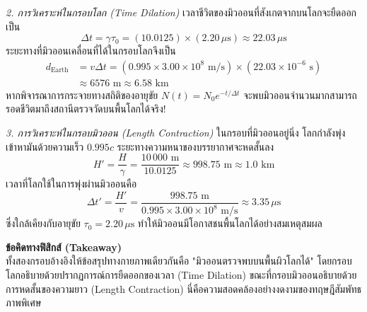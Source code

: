 \begin{psctexample}
\textit{2. การวิเคราะห์ในกรอบโลก (Time Dilation)}
เวลาชีวิตของมิวออนที่สังเกตจากบนโลกจะยืดออกเป็น
\begin{equation}
\Delta t = \gamma \tau_0 = (10.0125) \times (2.20\,\mu\text{s}) \approx 22.03\,\mu\text{s}
\end{equation}
ระยะทางที่มิวออนเคลื่อนที่ได้ในกรอบโลกจึงเป็น
\begin{align}
d_{\text{Earth}} &= v \Delta t = (0.995 \times 3.00 \times 10^8\text{ m/s}) \times (22.03 \times 10^{-6}\text{ s}) \nonumber \\
&\approx 6576\text{ m} \approx 6.58\text{ km}
\end{align}
หากพิจารณาการกระจายทางสถิติของอายุขัย $N(t) = N_0 e^{-t/\Delta t}$ จะพบมิวออนจำนวนมากสามารถรอดชีวิตมาถึงสถานีตรวจวัดบนพื้นโลกได้จริง!

\textit{3. การวิเคราะห์ในกรอบมิวออน (Length Contraction)}
ในกรอบที่มิวออนอยู่นิ่ง โลกกำลังพุ่งเข้าหามันด้วยความเร็ว $0.995c$ ระยะทางความหนาของบรรยากาศจะหดสั้นลง
\begin{equation}
H' = \frac{H}{\gamma} = \frac{10\,000\text{ m}}{10.0125} \approx 998.75\text{ m} \approx 1.0\text{ km}
\end{equation}
เวลาที่โลกใช้ในการพุ่งผ่านมิวออนคือ
\begin{equation}
\Delta t' = \frac{H'}{v} = \frac{998.75\text{ m}}{0.995 \times 3.00 \times 10^8\text{ m/s}} \approx 3.35\,\mu\text{s}
\end{equation}
ซึ่งใกล้เคียงกับอายุขัย $\tau_0 = 2.20\,\mu\text{s}$ ทำให้มิวออนมีโอกาสชนพื้นโลกได้อย่างสมเหตุสมผล

\textbf{ข้อคิดทางฟิสิกส์ (Takeaway)} \\
ทั้งสองกรอบอ้างอิงให้ข้อสรุปทางกายภาพเดียวกันคือ "มิวออนตรวจพบบนพื้นผิวโลกได้" โดยกรอบโลกอธิบายด้วยปรากฏการณ์การยืดออกของเวลา (Time Dilation) ขณะที่กรอบมิวออนอธิบายด้วยการหดสั้นของความยาว (Length Contraction) นี่คือความสอดคล้องอย่างงดงามของทฤษฎีสัมพัทธภาพพิเศษ
\qedexam
\end{psctexample}

